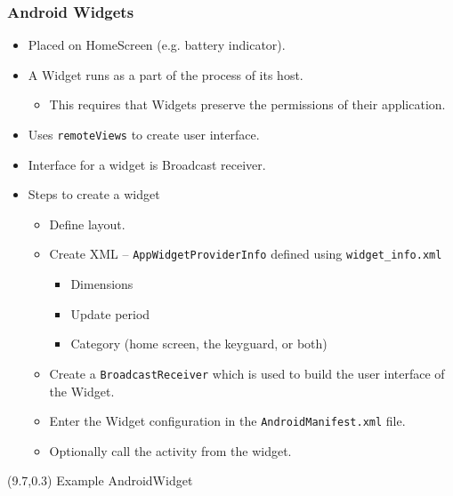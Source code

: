 \documentclass[10pt,xcolor=pdflatex]{beamer}
\newcommand{\file}[1]{\texttt{#1}}
\begin{document}
\begin{frame}\frametitle{Android Widgets}
	\begin{itemize}
		\item Placed on HomeScreen (e.g. battery indicator).
		\item A Widget runs as a part of the process of its host.
          \begin{itemize}
        	\item This requires that Widgets preserve the permissions of their application.
          \end{itemize}
		\item Uses \texttt{remoteViews} to create user interface.
		\item Interface for a widget is Broadcast receiver.
		\item Steps to create a widget
          \begin{itemize}
        	\item Define layout.
        	\item Create XML -- \texttt{AppWidgetProviderInfo} defined using \texttt{widget\_info.xml}
              \begin{itemize}
                \item Dimensions
                \item Update period
                \item Category (home screen, the keyguard, or both)
              \end{itemize}
        	\item Create a \texttt{BroadcastReceiver} which is used to build the user interface of the Widget.
        	\item Enter the Widget configuration in the \file{AndroidManifest.xml} file.
        	\item Optionally call the activity from the widget.
          \end{itemize}
	\end{itemize}
\begin{textblock}{15}(9.7,0.3)
    {\footnotesize Example AndroidWidget}
\end{textblock}
\end{frame}
\end{document}
